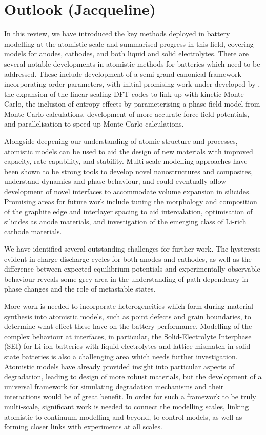 \documentclass[../main.tex]{subfiles}
\begin{document}
\section{Outlook (Jacqueline)}
In this review, we have introduced the key methods deployed in battery modelling at the atomistic scale and summarised progress in this field, covering models for anodes, cathodes, and both liquid and solid electrolytes. There are several notable developments in atomistic methods for batteries which need to be addressed. These include development of a semi-grand canonical framework incorporating order parameters, with initial promising work under developed by \citeauthor{VanderVen2020},\cite{VanderVen2020} the expansion of the linear scaling DFT codes to link up with kinetic Monte Carlo, the inclusion of entropy effects by parameterising a phase field model from Monte Carlo calculations, development of more accurate force field potentials, and parallelisation to speed up Monte Carlo calculations. 

Alongside deepening our understanding of atomic structure and processes, atomistic models can be used to aid the design of new materials with improved capacity, rate capability, and stability. Multi-scale modelling approaches have been shown to be strong tools to develop novel nanostructures and composites, understand dynamics and phase behaviour, and could eventually allow development of novel interfaces to accommodate volume expansion in silicides. Promising areas for future work include tuning the morphology and composition of the graphite edge  \cite{peng2020lithium,weydanz1994behavior,way1994effect} and interlayer spacing \cite{JI201866} to aid intercalation, optimisation of silicides as anode materials, and investigation of the emerging class of Li-rich cathode materials.

We have identified several outstanding challenges for further work. The hysteresis evident in charge-discharge cycles for both anodes and cathodes, as well as the difference between expected equilibrium potentials and experimentally observable behaviour reveals some grey area in the understanding of path dependency in phase changes and the role of metastable states.

More work is needed to incorporate heterogeneities which form during material synthesis into atomistic models, such as point defects and grain boundaries, to determine what effect these have on the battery performance. Modelling of the complex behaviour at interfaces, in particular, the Solid-Electrolyte Interphase (SEI) for Li-ion batteries with liquid electrolytes and lattice mismatch in solid state batteries is also a challenging area which needs further investigation. Atomistic models have already provided insight into particular aspects of degradation, leading to design of more robust materials, but the development of a universal framework for simulating degradation mechanisms and their interactions would be of great benefit. In order for such a framework to be truly multi-scale, significant work is needed to connect the modelling scales, linking atomistic to continuum modelling and beyond, to control models, as well as forming closer links with experiments at all scales.
\end{document}
